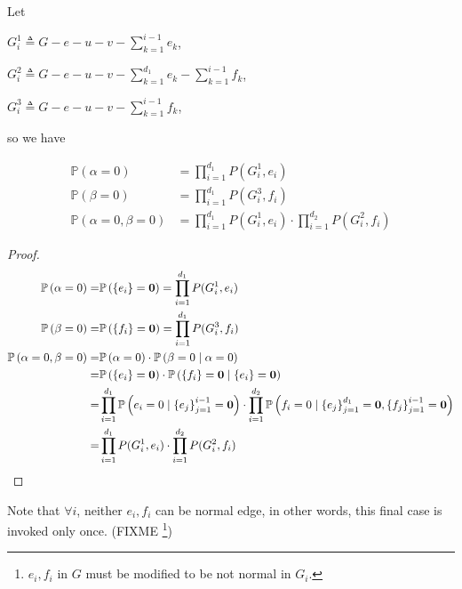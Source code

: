 Let

$G_i^1 \triangleq G - e - u - v - \sum_{k=1}^{i-1} e_k$,

$G_i^2 \triangleq G-e-u-v - \sum_{k=1}^{d_1}e_k - \sum_{k=1}^{i-1} f_k$,

$G_i^3 \triangleq G - e - u - v - \sum_{k=1}^{i-1} f_k$,

so we have

\begin{Prop}
	\begin{align*}
		\mathbb{P}\left( \alpha = 0\right) &= \prod_{i=1}^{d_1} P(G_i^1, e_i) \\
		\mathbb{P}\left( \beta = 0\right) &= \prod_{i=1}^{d_1} P(G_i^3, f_i) \\
		\mathbb{P}\left( \alpha = 0, \beta = 0 \right) &= \prod_{i=1}^{d_1} P(G_i^1, e_i) \cdot \prod_{i=1}^{d_2} P(G_i^2, f_i) 
	\end{align*}
\end{Prop}

\begin{proof}
	\begin{align*}
		\mathbb{P}\left( \alpha = 0\right) =&\mathbb{P} \left( \left\{e_i\right\} = \mathbf{0}\right) =	\prod_{i=1}^{d_1} P(G_i^1, e_i) \\
		\mathbb{P}\left( \beta = 0\right) =&\mathbb{P} \left( \left\{f_i\right\} = \mathbf{0}\right) =	\prod_{i=1}^{d_1} P(G_i^3, f_i) \\
		\mathbb{P}\left( \alpha = 0, \beta = 0 \right) =& \mathbb{P} \left( \alpha = 0 \right) \cdot \mathbb{P}\left( \beta = 0 \mid \alpha = 0 \right) \\
		=& \mathbb{P} \left( \left\{e_i\right\} = \mathbf{0}\right) \cdot \mathbb{P} \left( \left\{f_i\right\} = \mathbf{0} \mid \left\{e_i\right\} = \mathbf{0} \right) \\
=&\prod_{i=1}^{d_1} \mathbb{P} \left( e_i = 0 \mid \left\{e_j\right\}_{j=1}^{i-1} = \mathbf{0} \right) \cdot \prod_{i=1}^{d_2} \mathbb{P} \left( f_i = 0 \mid \left\{e_j\right\}_{j=1}^{d_1} = \mathbf{0},\left\{f_j\right\}_{j=1}^{i-1} = \mathbf{0} \right) \\
=& \prod_{i=1}^{d_1} P(G_i^1, e_i) \cdot \prod_{i=1}^{d_2} P(G_i^2, f_i) 
	\end{align*}
\end{proof}

Note that $\forall i$, neither $e_i, f_i$ can be normal edge, in other words, this final case is invoked only once.
(FIXME \footnote{$e_i,f_i$ in $G$ must be modified to be not normal in $G_i$.})

